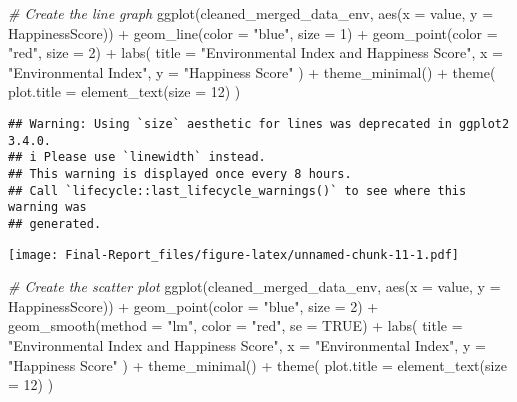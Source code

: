 \documentclass[
]{article}
\newenvironment{Shaded}{\begin{snugshade}}{\end{snugshade}}
\newcommand{\AttributeTok}[1]{\textcolor[rgb]{0.77,0.63,0.00}{#1}}
\newcommand{\CommentTok}[1]{\textcolor[rgb]{0.56,0.35,0.01}{\textit{#1}}}
\newcommand{\ConstantTok}[1]{\textcolor[rgb]{0.00,0.00,0.00}{#1}}
\newcommand{\DecValTok}[1]{\textcolor[rgb]{0.00,0.00,0.81}{#1}}
\newcommand{\FunctionTok}[1]{\textcolor[rgb]{0.00,0.00,0.00}{#1}}
\newcommand{\NormalTok}[1]{#1}
\newcommand{\SpecialCharTok}[1]{\textcolor[rgb]{0.00,0.00,0.00}{#1}}
\newcommand{\StringTok}[1]{\textcolor[rgb]{0.31,0.60,0.02}{#1}}
\begin{document}
\begin{Shaded}
\begin{Highlighting}[]
\CommentTok{\# Create the line graph}
\FunctionTok{ggplot}\NormalTok{(cleaned\_merged\_data\_env, }\FunctionTok{aes}\NormalTok{(}\AttributeTok{x =}\NormalTok{ value, }\AttributeTok{y =}\NormalTok{ HappinessScore)) }\SpecialCharTok{+}
  \FunctionTok{geom\_line}\NormalTok{(}\AttributeTok{color =} \StringTok{"blue"}\NormalTok{, }\AttributeTok{size =} \DecValTok{1}\NormalTok{) }\SpecialCharTok{+}  
  \FunctionTok{geom\_point}\NormalTok{(}\AttributeTok{color =} \StringTok{"red"}\NormalTok{, }\AttributeTok{size =} \DecValTok{2}\NormalTok{) }\SpecialCharTok{+} 
  \FunctionTok{labs}\NormalTok{(}
    \AttributeTok{title =} \StringTok{"Environmental Index and Happiness Score"}\NormalTok{,}
    \AttributeTok{x =} \StringTok{"Environmental Index"}\NormalTok{,}
    \AttributeTok{y =} \StringTok{"Happiness Score"}
\NormalTok{  ) }\SpecialCharTok{+}
  \FunctionTok{theme\_minimal}\NormalTok{() }\SpecialCharTok{+} 
  \FunctionTok{theme}\NormalTok{(}
    \AttributeTok{plot.title =} \FunctionTok{element\_text}\NormalTok{(}\AttributeTok{size =} \DecValTok{12}\NormalTok{) }
\NormalTok{  )}
\end{Highlighting}
\end{Shaded}

\begin{verbatim}
## Warning: Using `size` aesthetic for lines was deprecated in ggplot2 3.4.0.
## i Please use `linewidth` instead.
## This warning is displayed once every 8 hours.
## Call `lifecycle::last_lifecycle_warnings()` to see where this warning was
## generated.
\end{verbatim}

\texttt{[image: Final-Report\_files/figure-latex/unnamed-chunk-11-1.pdf]}

\begin{Shaded}
\begin{Highlighting}[]
\CommentTok{\# Create the scatter plot}
\FunctionTok{ggplot}\NormalTok{(cleaned\_merged\_data\_env, }\FunctionTok{aes}\NormalTok{(}\AttributeTok{x =}\NormalTok{ value, }\AttributeTok{y =}\NormalTok{ HappinessScore)) }\SpecialCharTok{+}
  \FunctionTok{geom\_point}\NormalTok{(}\AttributeTok{color =} \StringTok{"blue"}\NormalTok{, }\AttributeTok{size =} \DecValTok{2}\NormalTok{) }\SpecialCharTok{+}               
  \FunctionTok{geom\_smooth}\NormalTok{(}\AttributeTok{method =} \StringTok{"lm"}\NormalTok{, }\AttributeTok{color =} \StringTok{"red"}\NormalTok{, }\AttributeTok{se =} \ConstantTok{TRUE}\NormalTok{) }\SpecialCharTok{+} 
  \FunctionTok{labs}\NormalTok{(}
    \AttributeTok{title =} \StringTok{"Environmental Index and Happiness Score"}\NormalTok{,}
    \AttributeTok{x =} \StringTok{"Environmental Index"}\NormalTok{,}
    \AttributeTok{y =} \StringTok{"Happiness Score"}
\NormalTok{  ) }\SpecialCharTok{+}
  \FunctionTok{theme\_minimal}\NormalTok{() }\SpecialCharTok{+} 
  \FunctionTok{theme}\NormalTok{(}
    \AttributeTok{plot.title =} \FunctionTok{element\_text}\NormalTok{(}\AttributeTok{size =} \DecValTok{12}\NormalTok{) }
\NormalTok{  )}
\end{Highlighting}
\end{Shaded}
\end{document}
